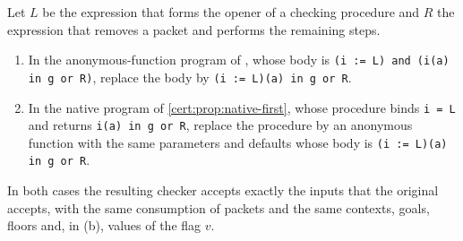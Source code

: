 \begin{proposition}\label{cert:prop:immediate}
Let $L$ be the expression that forms the opener of a checking procedure and
$R$ the expression that removes a packet and performs the remaining steps.
\begin{enumerate}[label=(\alph*)]
\item In the anonymous-function program of , whose body is
\texttt{(i := L) and (i(a) in g or R)}, replace the body by
\texttt{(i := L)(a) in g or R}.
\item In the native program of \cref{cert:prop:native-first}, whose procedure
binds \texttt{i = L} and returns \texttt{i(a) in g or R}, replace the
procedure by an anonymous function with the same parameters and defaults
whose body is \texttt{(i := L)(a) in g or R}.
\end{enumerate}
In both cases the resulting checker accepts exactly the inputs that the
original accepts, with the same consumption of packets and the same
contexts, goals, floors and, in (b), values of the flag $v$.
\end{proposition}
